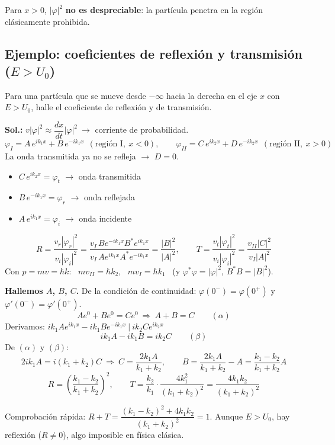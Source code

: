\documentclass[11pt,a4paper]{article}
\begin{document}
Para $x>0$, $|\varphi|^2$ \textbf{no es despreciable}: la partícula penetra en la región clásicamente prohibida.

\subsection{Ejemplo: coeficientes de reflexión y transmisión ($E>U_0$)}
Para una partícula que se mueve desde $-\infty$ hacia la derecha en el eje $x$ con $E>U_0$, halle el coeficiente de
reflexión y de transmisión.

\textbf{Sol.:} $v|\varphi|^2\approx\dfrac{dx}{dt}|\varphi|^2\ \rightarrow$ corriente de probabilidad.
\[
\varphi_I=A\,e^{ik_1x}+B\,e^{-ik_1x}\ \ (\text{región I},\ x<0),\qquad
\varphi_{II}=C\,e^{ik_2x}+D\,e^{-ik_2x}\ \ (\text{región II},\ x>0)
\]
La onda transmitida ya no se refleja $\rightarrow$ $D=0$.
\begin{itemize}
  \item $C\,e^{ik_2x}=\varphi_t$ $\rightarrow$ onda transmitida
  \item $B\,e^{-ik_1x}=\varphi_r$ $\rightarrow$ onda reflejada
  \item $A\,e^{ik_1x}=\varphi_i$ $\rightarrow$ onda incidente
\end{itemize}
\[
R=\frac{v_r|\varphi_r|^2}{v_i|\varphi_i|^2}=\frac{v_I\,Be^{-ik_1x}B^*e^{ik_1x}}{v_I\,Ae^{ik_1x}A^*e^{-ik_1x}}=\frac{|B|^2}{|A|^2},
\qquad
T=\frac{v_t|\varphi_t|^2}{v_i|\varphi_i|^2}=\frac{v_{II}|C|^2}{v_I|A|^2}
\]
Con $p=mv=\hbar k$: \ $mv_{II}=\hbar k_2$, \ $mv_I=\hbar k_1$ \ (y $\varphi^*\varphi=|\varphi|^2$, $B^*B=|B|^2$).

\textbf{Hallemos $A$, $B$, $C$.} De la condición de continuidad: $\varphi(0^-)=\varphi(0^+)$ y $\varphi'(0^-)=\varphi'(0^+)$.
\[
Ae^0+Be^0=Ce^0\ \Rightarrow\ A+B=C\qquad(\alpha)
\]
Derivamos: $ik_1Ae^{ik_1x}-ik_1Be^{-ik_1x}\ \big|\ ik_2Ce^{ik_2x}$
\[
ik_1A-ik_1B=ik_2C\qquad(\beta)
\]
De $(\alpha)$ y $(\beta)$:
\[
2ik_1A=i(k_1+k_2)C\ \Rightarrow\ C=\frac{2k_1A}{k_1+k_2},\qquad
B=\frac{2k_1A}{k_1+k_2}-A=\frac{k_1-k_2}{k_1+k_2}A
\]
\[
\boxed{R=\left(\frac{k_1-k_2}{k_1+k_2}\right)^2,\qquad T=\frac{k_2}{k_1}\cdot\frac{4k_1^2}{(k_1+k_2)^2}=\frac{4k_1k_2}{(k_1+k_2)^2}}
\]

\begin{obs}
Comprobación rápida: $R+T=\dfrac{(k_1-k_2)^2+4k_1k_2}{(k_1+k_2)^2}=1$. Aunque $E>U_0$, hay reflexión ($R\neq0$), algo
imposible en física clásica.
\end{obs}

\end{document}
